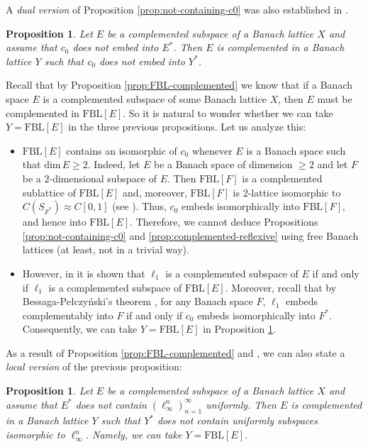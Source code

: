 \documentclass[11pt]{amsart}
\newtheorem{prop}[thm]{Proposition}
\theoremstyle{definition}
\numberwithin{equation}{section}
\newcommand{\fbl}{\text{FBL}}
\begin{document}
A \textit{dual version} of Proposition \ref{prop:not-containing-c0} was also established in \cite[Theorem 1.2]{FGJ}.
\begin{prop}\label{prop:complemented-dual}
    Let $E$ be a complemented subspace of a Banach lattice $X$ and assume that $c_0$ does not embed into $E^*$. Then $E$ is complemented in a Banach lattice $Y$ such that $c_0$ does not embed into $Y^*$.
\end{prop}

Recall that by Proposition \ref{prop:FBL-complemented} we know that if a Banach space $E$ is a complemented subspace of some Banach lattice $X$, then $E$ must be complemented in $\fbl[E]$. So it is natural to wonder whether we can take $Y=\fbl[E]$ in the three previous propositions. Let us analyze this:
\begin{itemize}
    \item $\fbl[E]$ contains an isomorphic of $c_0$ whenever $E$ is a Banach space such that $\text{dim}\,E\geq 2$. Indeed, let $E$ be a Banach space of dimension $\geq 2$ and let $F$ be a $2$-dimensional subspace of $E$. Then $\fbl[F]$ is a complemented sublattice of $\fbl[E]$ and, moreover, $\fbl[F]$ is $2$-lattice isomorphic to $C(S_{F^*})\approx C[0,1]$ (see \cite[Remark 3.1 (i)]{O24}). Thus, $c_0$ embeds isomorphically into $\fbl[F]$, and hence into $\fbl[E]$. Therefore, we cannot deduce Propositions \ref{prop:not-containing-c0} and \ref{prop:complemented-reflexive} using free Banach lattices (at least, not in a trivial way).
    
    \item However, in \cite[Theorem 9.20]{OTTT24} it is shown that $\ell_1$ is a complemented subspace of $E$ if and only if $\ell_1$ is a complemented subspace of $\fbl[E]$. Moreover, recall that by Bessaga-Pe\l{}czy\'{n}ski's theorem \cite[Proposition 2.e.8]{LT1-book}, for any Banach space $F$, $\ell_1$ embeds complementably into $F$ if and only if $c_0$ embeds isomorphically into $F^*$. Consequently, we can take $Y=\fbl[E]$ in Proposition \ref{prop:complemented-dual}.
\end{itemize}
As a result of Proposition \ref{prop:FBL-complemented} and \cite[Corollary 9.25 and Lemma 9.26]{OTTT24}, we can also state a \textit{local version} of the previous proposition:

\begin{prop}
    Let $E$ be a complemented subspace of a Banach lattice $X$ and assume that $E^*$ does not contain $(\ell_\infty^n)_{n=1}^\infty$ uniformly. Then $E$ is complemented in a Banach lattice $Y$ such that $Y^*$ does not contain uniformly subspaces isomorphic to $\ell_\infty^n$. Namely, we can take $Y=\fbl[E]$. 
\end{prop}
\end{document}
